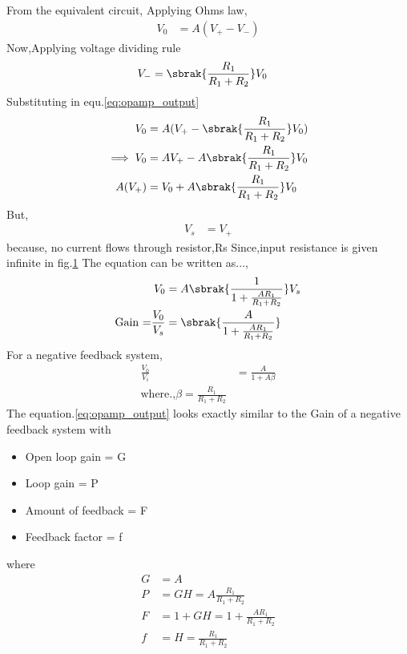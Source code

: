 \begin{enumerate}[label=\thesubsection.\arabic*.,ref=\thesubsection.\theenumi]
\begin{figure}[!ht]
\begin{center}
		\resizebox{\columnwidth}{!}{}
	\end{center}
\caption{}
\label{fig:equivalent_circuit}
\end{figure}
From the equivalent circuit,
Applying Ohms law,
\begin{align}
V_0 &= A(V_+ - V_-) \label{eq:opamp_output}
\end{align}
Now,Applying voltage dividing rule
\begin{align}
V_- &= \sbrak{\frac{R_1}{R_1+R_2}}V_0
\end{align}
Substituting in equ.\ref{eq:opamp_output}
\begin{align}
    V_0 &= A(V_+-\sbrak{\frac{R_1}{R_1+R_2}}V_0)
    \\
\implies V_0 &= AV_+-A\sbrak{\frac{R_1}{R_1+R_2}}V_0
    \\
A(V_+)&=V_0+A\sbrak{\frac{R_1}{R_1+R_2}}V_0
\end{align}
But,
\begin{align}
    V_s &= V_+
\end{align}
because, no current flows through resistor,Rs Since,input resistance is given infinite in fig.\ref{fig:equivalent_circuit} 
The equation can be written as...,
\begin{align}
    V_0 &= A\sbrak{\frac{1}{1+\frac{AR_1}{R_1+R_2}}}V_s
    \\
 \text{Gain =}\frac{V_0}{V_s}&=\sbrak{\frac{A}{1+\frac{AR_1}{R_1+R_2}}}\label{eq:opamp_gain}
\end{align}
For a negative feedback system,
\begin{align}
   \frac{V_0}{V_i} &= \frac{A}{1+A\beta}
  \\
  \text{where.,} \beta = \frac{R_1}{R_1+R_2}
\end{align}
The equation.\ref{eq:opamp_output} looks exactly similar to the Gain of a negative feedback system with
\begin{itemize}
    \item Open loop gain = G
    \item Loop gain = P 
    \item Amount of feedback = F
    \item Feedback factor = f
\end{itemize}
where
\begin{align}
    G &= A\\
    P &= GH = A\frac{R_1}{R_1+R_2}\\
    F &= 1+GH= 1 + \frac{AR_1}{R_1+R_2}\\
    f &= H= \frac{R_1}{R_1+R_2}

\end{align}
\end{enumerate}
